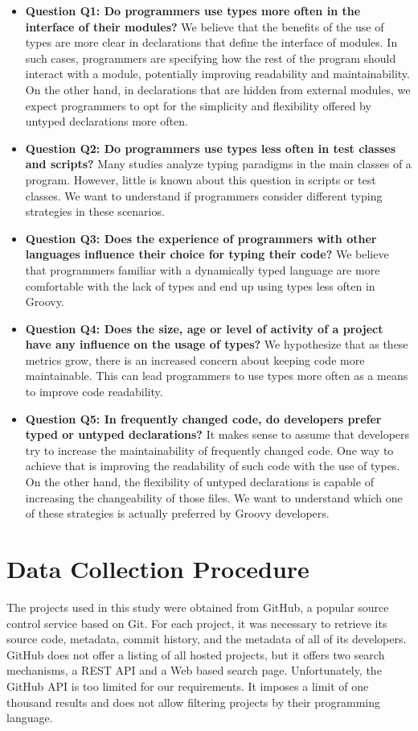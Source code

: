 \documentclass[msc]{ppgccufmg}
\begin{document}
\begin{itemize}
	\item \textbf{Question Q1: Do programmers use types more often in the interface of their modules?} We believe that the benefits of the use of types are more clear in declarations that define the interface of modules. In such cases, programmers are specifying how the rest of the program should interact with a module, potentially improving readability and maintainability. On the other hand, in declarations that are hidden from external modules, we expect programmers to opt for the simplicity and flexibility offered by untyped declarations more often. 
	
	\item \textbf{Question Q2: Do programmers use types less often in test classes and scripts?} Many studies analyze typing paradigms in the main classes of a program. However, little is known about this question in scripts or test classes. We want to understand if programmers consider different typing strategies in these scenarios.

	\item \textbf{Question Q3: Does the experience of programmers with other languages influence their choice for typing their code?} We believe that programmers familiar with a dynamically typed language are more comfortable with the lack of types and end up using types less often in Groovy. 

	\item \textbf{Question Q4: Does the size, age or level of activity of a project have any influence on the usage of types?} We hypothesize that as these metrics grow, there is an increased concern about keeping code more maintainable. This can lead programmers to use types more often as a means to improve code readability.

	\item \textbf{Question Q5: In frequently changed code, do developers prefer typed or untyped declarations?} It makes sense to assume that developers try to increase the maintainability of frequently changed code. One way to achieve that is improving the readability of such code with the use of types. On the other hand, the flexibility of untyped declarations is capable of increasing the changeability of those files. We want to understand which one of these strategies is actually preferred by Groovy developers.

\end{itemize}


\section{Data Collection Procedure\label{dataCollection}}
The projects used in this study were obtained from GitHub, a popular source control service based on Git.
For each project, it was necessary to retrieve its source code, metadata, commit history, and the metadata of all of its developers.
GitHub does not offer a listing of all hosted projects, but it offers two search mechanisms, a REST API and a Web based search page.
Unfortunately, the GitHub API is too limited for our requirements.
It imposes a limit of one thousand results and does not allow filtering projects by their programming language.
\end{document}
